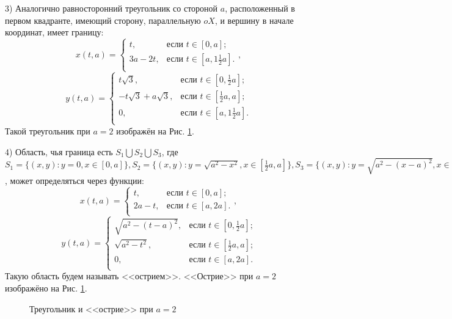 \documentclass[a4paper]{article}
\begin{document}
  3) Аналогично равносторонний треугольник со стороной $a$, расположенный в первом квадранте, имеющий сторону, параллельную $oX$, и вершину в начале координат, имеет границу:
        \[
          x(t,a) =
          \begin{cases}
            t,     & \text{если $t \in [0,a]$;}             \\
            3a-2t, & \text{если $t \in [a,1\frac{1}{2}a]$.} \\
          \end{cases},
        \]
        \[y(t,a) =
          \begin{cases}
            t \sqrt{3},            & \text{если $t \in [0,\frac{1}{2}a]$;}  \\
            -t \sqrt{3}+a\sqrt{3}, & \text{если $t \in [\frac{1}{2}a,a]$;}  \\
            0,                     & \text{если $t \in [a,1\frac{1}{2}a]$.} \\
          \end{cases}
        \]
        Такой треугольник при $a=2$ изображён на Рис. \ref{tros}.

  4) Область, чья граница есть $S_1 \bigcup S_2 \bigcup S_3$, где $S_1=\{(x,y): y=0, x \in [0, a]\},S_2=\{(x,y): y=\sqrt{a^2-x^2}, x \in [\frac{1}{2}a, a]\},S_3=\{(x,y): y=\sqrt{a^2-(x-a)^2}, x \in [0,\frac{1}{2} a]\}$, может определяться через функции:
        \[
          x(t,a) =
          \begin{cases}
            t,    & \text{если $t \in [0,a]$;}  \\
            2a-t, & \text{если $t \in [a,2a]$.} \\
          \end{cases},
        \]
        \[y(t,a) =
          \begin{cases}
            \sqrt{a^2-(t-a)^2}, & \text{если $t \in [0,\frac{1}{2}a]$;} \\
            \sqrt{a^2-t^2},     & \text{если $t \in [\frac{1}{2}a,a]$;} \\
            0,                  & \text{если $t \in [a,2a]$.}           \\
          \end{cases}
        \]
        Такую область будем называть <<острием>>. <<Острие>> при $a=2$ изображёно на Рис. \ref{tros}.

        \begin{figure}[h!]
          \noindent{}
          \caption{Треугольник и <<острие>> при $a=2$}
          \label{tros}
        \end{figure}
\end{document}
